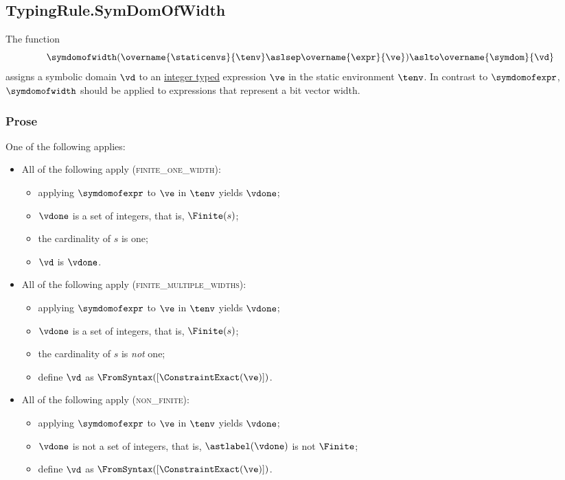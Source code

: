 \subsection{TypingRule.SymDomOfWidth \label{sec:TypingRule.SymDomOfWidth}}
\hypertarget{def-symdomofwidth}{}
The function
\[
\symdomofwidth(
  \overname{\staticenvs}{\tenv} \aslsep
  \overname{\expr}{\ve}
) \aslto
\overname{\symdom}{\vd}
\]
assigns a symbolic domain $\vd$ to an \underline{integer typed} expression $\ve$ in the static environment $\tenv$.
In contrast to $\symdomofexpr$, $\symdomofwidth$ should be applied to expressions that represent a bit vector width.

\subsubsection{Prose}
One of the following applies:
\begin{itemize}
  \item All of the following apply (\textsc{finite\_one\_width}):
  \begin{itemize}
    \item applying $\symdomofexpr$ to $\ve$ in $\tenv$ yields $\vdone$;
    \item $\vdone$ is a set of integers, that is, $\Finite(s)$;
    \item the cardinality of $s$ is one;
    \item $\vd$ is $\vdone$.
  \end{itemize}

  \item All of the following apply (\textsc{finite\_multiple\_widths}):
  \begin{itemize}
    \item applying $\symdomofexpr$ to $\ve$ in $\tenv$ yields $\vdone$;
    \item $\vdone$ is a set of integers, that is, $\Finite(s)$;
    \item the cardinality of $s$ is \emph{not} one;
    \item define $\vd$ as $\FromSyntax([\ConstraintExact(\ve)])$.
  \end{itemize}

  \item All of the following apply (\textsc{non\_finite}):
  \begin{itemize}
    \item applying $\symdomofexpr$ to $\ve$ in $\tenv$ yields $\vdone$;
    \item $\vdone$ is not a set of integers, that is, $\astlabel(\vdone)$ is not $\Finite$;
    \item define $\vd$ as $\FromSyntax([\ConstraintExact(\ve)])$.
  \end{itemize}
\end{itemize}

